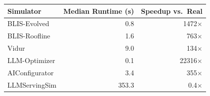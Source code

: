 \begin{tabular}{lrr}
\toprule
Simulator & Median Runtime (s) & Speedup vs.\ Real \\
\midrule
BLIS-Evolved & 0.8 & 1472$\times$ \\
BLIS-Roofline & 1.6 & 763$\times$ \\
Vidur & 9.0 & 134$\times$ \\
LLM-Optimizer & 0.1 & 22316$\times$ \\
AIConfigurator & 3.4 & 355$\times$ \\
LLMServingSim & 353.3 & 0.4$\times$ \\
\bottomrule
\end{tabular}
